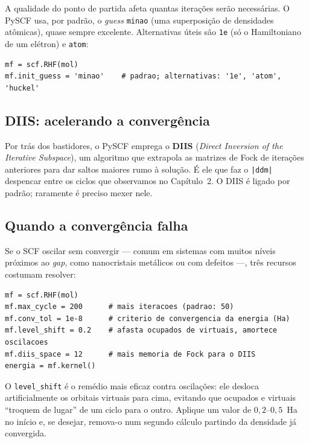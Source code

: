 \documentclass[11pt,a4paper,openany]{book}
\newcommand{\code}[1]{\texttt{#1}}
\newcommand{\pyscf}{\textsf{PySCF}}
\begin{document}
A qualidade do ponto de partida afeta quantas iterações serão necessárias. O
\pyscf{} usa, por padrão, o \emph{guess} \code{minao} (uma superposição de
densidades atômicas), quase sempre excelente. Alternativas úteis são \code{1e} (só
o Hamiltoniano de um elétron) e \code{atom}:

\begin{lstlisting}[style=python,caption={Escolhendo o \emph{guess} inicial.},label={lst:guess}]
mf = scf.RHF(mol)
mf.init_guess = 'minao'    # padrao; alternativas: '1e', 'atom', 'huckel'
\end{lstlisting}

\subsection{DIIS: acelerando a convergência}

Por trás dos bastidores, o \pyscf{} emprega o \textbf{DIIS} (\emph{Direct
Inversion of the Iterative Subspace}), um algoritmo que extrapola as matrizes de
Fock de iterações anteriores para dar saltos maiores rumo à solução. É ele que
faz o \code{|ddm|} despencar entre os ciclos que observamos no Capítulo~2. O DIIS é
ligado por padrão; raramente é preciso mexer nele.

\subsection{Quando a convergência falha}

Se o SCF oscilar sem convergir --- comum em sistemas com muitos níveis próximos ao
\emph{gap}, como nanocristais metálicos ou com defeitos ---, três recursos costumam
resolver:

\begin{lstlisting}[style=python,caption={Estabilizando um SCF difícil.},label={lst:convfix}]
mf = scf.RHF(mol)
mf.max_cycle = 200      # mais iteracoes (padrao: 50)
mf.conv_tol = 1e-8      # criterio de convergencia da energia (Ha)
mf.level_shift = 0.2    # afasta ocupados de virtuais, amortece oscilacoes
mf.diis_space = 12      # mais memoria de Fock para o DIIS
energia = mf.kernel()
\end{lstlisting}

\begin{caixadica}
O \code{level\_shift} é o remédio mais eficaz contra oscilações: ele desloca
artificialmente os orbitais virtuais para cima, evitando que ocupados e virtuais
``troquem de lugar'' de um ciclo para o outro. Aplique um valor de $0{,}2$--$0{,}5$~Ha
no início e, se desejar, remova-o num segundo cálculo partindo da densidade já
convergida.
\end{caixadica}
\end{document}
